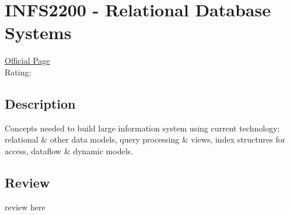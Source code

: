 \hypertarget{INFS2200}{\section{INFS2200 - Relational Database Systems}}

\large
\textcolor{turbo_purple}{\href{https://my.uq.edu.au/programs-courses/course.html?course_code=INFS2200}{Official Page}} \\
Rating: \cstar\cstar\cstar\cstar\ostar

\normalsize
\subsection*{Description}
Concepts needed to build large information system using current technology; relational \& other data models, query processing \& views, index structures for access, dataflow \& dynamic models.

\subsection*{Review}
review here
